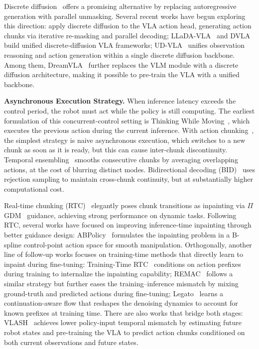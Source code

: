\documentclass{article}
\begin{document}
Discrete diffusion~\citep{lou2023discrete} offers a promising alternative by replacing autoregressive generation with parallel unmasking.
Several recent works have begun exploring this direction:
\citet{liang2025discrete} apply discrete diffusion to the VLA action head, generating action chunks via iterative re-masking and parallel decoding;
LLaDA-VLA~\citep{wen2025llada} and DVLA~\citep{wen2025dvla} build unified discrete-diffusion VLA frameworks;
UD-VLA~\citep{chen2025unified} unifies observation reasoning and action generation within a single discrete diffusion backbone.
Among them, DreamVLA~\citep{ye2025dream} further replaces the VLM module with a discrete diffusion architecture, making it possible to pre-train the VLA with a unified backbone.


\textbf{Asynchronous Execution Strategy.}
When inference latency exceeds the control period, the robot must act while the policy is still computing.
The earliest formulation of this concurrent-control setting is Thinking While Moving~\citep{xiao2020thinking}, which executes the previous action during the current inference.
With action chunking~\citep{lai2025action}, the simplest strategy is naive asynchronous execution, which switches to a new chunk as soon as it is ready, but this can cause inter-chunk discontinuity.
Temporal ensembling~\citep{zhao2023learning} smooths consecutive chunks by averaging overlapping actions, at the cost of blurring distinct modes.
Bidirectional decoding (BID)~\citep{liu2024bidirectional} uses rejection sampling to maintain cross-chunk continuity, but at substantially higher computational cost.

Real-time chunking (RTC)~\citep{wang2026real} elegantly poses chunk transitions as inpainting via $\Pi$GDM~\citep{song2023pseudoinverse} guidance, achieving strong performance on dynamic tasks.
Following RTC, several works have focused on improving inference-time inpainting through better guidance design:
ABPolicy~\citep{yang2026abpolicy} formulates the inpainting problem in a B-spline control-point action space for smooth manipulation.
Orthogonally, another line of follow-up works focuses on training-time methods that directly learn to inpaint during fine-tuning:
Training-Time RTC~\citep{black2025training} conditions on action prefixes during training to internalize the inpainting capability;
REMAC~\citep{wang2026real} follows a similar strategy but further eases the training--inference mismatch by mixing ground-truth and predicted actions during fine-tuning;
Legato~\citep{liu2026learning} learns a continuation-aware flow that reshapes the denoising dynamics to account for known prefixes at training time.
There are also works that bridge both stages: VLASH~\citep{tang2025vlash} achieves lower policy-input temporal mismatch by estimating future robot states and pre-training the VLA to predict action chunks conditioned on both current observations and future states.
\end{document}
